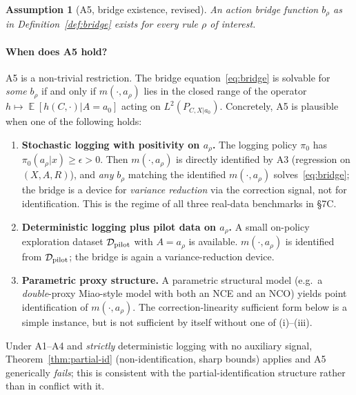 \documentclass[11pt]{article}
\newtheorem{assumption}{Assumption}
\DeclareMathOperator{\E}{\mathbb{E}}
\begin{document}
\begin{assumption}[A5, bridge existence, revised]\label{ass:A5}
An action bridge function $b_\rho$ as in
Definition~\ref{def:bridge} exists for every rule $\rho$ of interest.
\end{assumption}

\paragraph{When does A5 hold?}
A5 is a non-trivial restriction.  The bridge equation~\eqref{eq:bridge}
is solvable for \emph{some} $b_\rho$ if and only if
$m(\cdot, a_\rho)$ lies in the closed range of the operator
$h \mapsto \E[h(C, \cdot) | A = a_0]$ acting on $L^2(P_{C, X | a_0})$.
Concretely, A5 is plausible when one of the following holds:
\begin{enumerate}
\item[(i)] \textbf{Stochastic logging with positivity on $a_\rho$.}
  The logging policy $\pi_0$ has $\pi_0(a_\rho | x) \ge \epsilon > 0$.
  Then $m(\cdot, a_\rho)$ is directly identified by A3 (regression on
  $(X, A, R)$), and \emph{any} $b_\rho$ matching the identified
  $m(\cdot, a_\rho)$ solves~\eqref{eq:bridge}; the bridge is a
  device for \emph{variance reduction} via the correction signal,
  not for identification.  This is the regime of all three real-data
  benchmarks in §7C.
\item[(ii)] \textbf{Deterministic logging plus pilot data on $a_\rho$.}
  A small on-policy exploration dataset $\mathcal{D}_{\rm pilot}$
  with $A = a_\rho$ is available.  $m(\cdot, a_\rho)$ is identified
  from $\mathcal{D}_{\rm pilot}$; the bridge is again a
  variance-reduction device.
\item[(iii)] \textbf{Parametric proxy structure.}  A parametric
  structural model (e.g.\ a \emph{double}-proxy Miao-style model with
  both an NCE and an NCO) yields point identification of
  $m(\cdot, a_\rho)$.  The correction-linearity sufficient form
  below is a simple instance, but is not sufficient by itself
  without one of (i)--(iii).
\end{enumerate}
Under A1--A4 and \emph{strictly} deterministic logging with no auxiliary
signal, Theorem~\ref{thm:partial-id} (non-identification, sharp
bounds) applies and A5 generically \emph{fails}; this is consistent
with the partial-identification structure rather than in conflict
with it.
\end{document}
